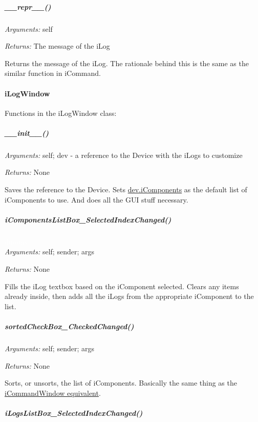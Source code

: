 \documentclass[12pt,letterpaper]{article}
\begin{document}
%
%
\subparagraph{\_\_repr\_\_()}
\label{4.6.1.5.1}

\emph{Arguments:} self

\emph{Returns:} The message of the iLog

Returns the message of the iLog. The rationale behind this is the same as the similar function in iCommand.



%
%
\paragraph{iLogWindow}
\label{4.6.1.6}

Functions in the iLogWindow class:

\setcounter{subparagraph}{-1}



%
%
\subparagraph{\_\_init\_\_()}
\label{4.6.1.6.0}

\emph{Arguments:} self; dev - a reference to the Device with the iLogs to customize

\emph{Returns:} None

Saves the reference to the Device. Sets \hyperref[4.3.2.2.1]{dev.iComponents} as the default list of iComponents to use. And does all the GUI stuff necessary.



%
%
\subparagraph{iComponentsListBox\_SelectedIndexChanged()}
\label{4.6.1.6.1}

\textcolor{white}{dummy} \\ \emph{Arguments:} self; sender; args

\emph{Returns:} None

Fills the iLog textbox based on the iComponent selected. Clears any items already inside, then adds all the iLogs from the appropriate iComponent to the list.



%
%
\subparagraph{sortedCheckBox\_CheckedChanged()}
\label{4.6.1.6.2}

\emph{Arguments:} self; sender; args

\emph{Returns:} None

Sorts, or unsorts, the list of iComponents. Basically the same thing as the \hyperref[4.5.1.1.1]{iCommandWindow equivalent}.



%
%
\subparagraph{iLogsListBox\_SelectedIndexChanged()}
\label{4.6.1.6.3}
\end{document}
